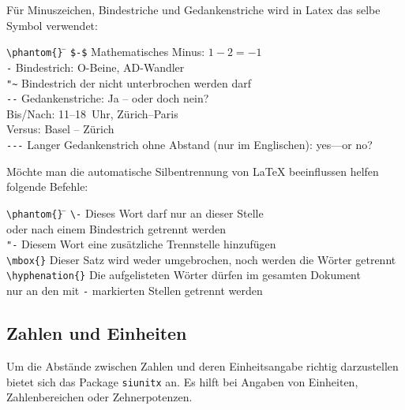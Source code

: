 Für Minuszeichen, Bindestriche und Gedankenstriche wird in Latex das selbe Symbol verwendet:
\begin{tabbing}
\quad \= \verb|\phantom{}| \qquad \= \kill
      \> \verb|$-$|        \> Mathematisches Minus: $1-2=-1$ \\
      \> \verb|-|          \> Bindestrich: O-Beine, AD-Wandler \\
      \> \verb|"~|         \> Bindestrich der nicht unterbrochen werden darf \\
      \> \verb|--|         \> Gedankenstriche: Ja -- oder doch nein? \\
      \>                   \> Bis/Nach: 11--18~Uhr, Zürich--Paris \\
      \>                   \> Versus: Basel -- Zürich \\
      \> \verb|---|        \> Langer Gedankenstrich ohne Abstand (nur im Englischen): yes---or no?\\
\end{tabbing}

Möchte man die automatische Silbentrennung von \LaTeX{} beeinflussen helfen folgende Befehle:
\begin{tabbing}
\quad \= \verb|\phantom{}| \qquad \= \kill
      \> \verb|\-|         \> Dieses Wort darf nur an dieser Stelle \\
      \>                   \> oder nach einem Bindestrich getrennt werden\\
      \> \verb|"-|         \> Diesem Wort eine zusätzliche Trennstelle hinzufügen \\
      \> \verb|\mbox{}|    \> Dieser Satz wird weder umgebrochen, noch werden die Wörter getrennt\\
      \> \verb|\hyphenation{}| \> Die aufgelisteten Wörter dürfen im gesamten Dokument \\
      \>                   \> nur an den mit \verb|-| markierten Stellen getrennt werden\\
\end{tabbing}

\clearpage

\subsection{Zahlen und Einheiten}
Um die Abstände zwischen Zahlen und deren Einheitsangabe richtig darzustellen bietet sich das Package \verb|siunitx| an. Es hilft bei Angaben von Einheiten, Zahlenbereichen oder Zehnerpotenzen.

